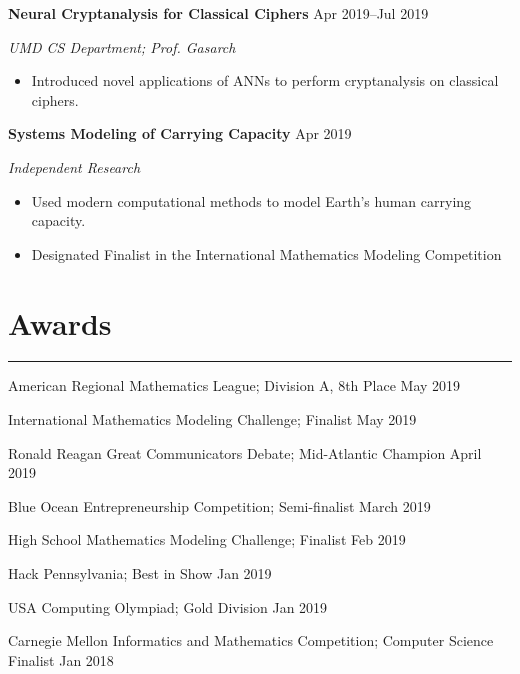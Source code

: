 \documentclass[12pt]{article}
\newcommand{\resumesection}[1]{\vspace{-0.3cm}\section*{\color{highlight}#1}\vspace{-0.3cm}\hrule\vspace{0.3cm}}
\begin{document}
\textbf{Neural Cryptanalysis for Classical Ciphers} \hfill Apr 2019--Jul 2019\par
\textit{UMD CS Department; Prof. Gasarch}
\begin{itemize}
	\item Introduced novel applications of ANNs to perform cryptanalysis on classical ciphers.
\end{itemize}\vspace{0.1cm}

\textbf{Systems Modeling of Carrying Capacity} \hfill Apr 2019\par
\textit{Independent Research}
\begin{itemize}
	\item Used modern computational methods to model Earth's human carrying capacity.
	\item Designated Finalist in the International Mathematics Modeling Competition
\end{itemize}


\resumesection{Awards}

American Regional Mathematics League; Division A, 8th Place \hfill May 2019 \par
International Mathematics Modeling Challenge; Finalist \hfill May 2019\par
Ronald Reagan Great Communicators Debate; Mid-Atlantic Champion \hfill April 2019\par
Blue Ocean Entrepreneurship Competition; Semi-finalist \hfill March 2019\par
High School Mathematics Modeling Challenge; Finalist \hfill Feb 2019\par
Hack Pennsylvania; Best in Show \hfill Jan 2019\par
USA Computing Olympiad; Gold Division \hfill Jan 2019\par
Carnegie Mellon Informatics and Mathematics Competition; Computer Science Finalist \hfill Jan 2018\par
\end{document}

